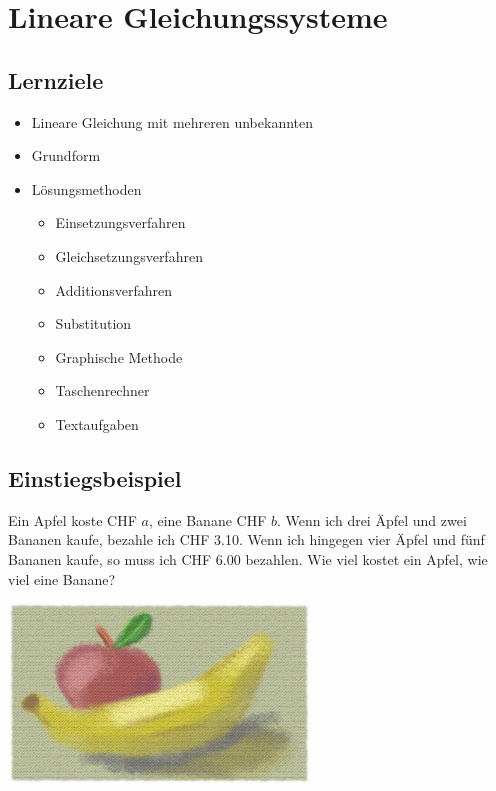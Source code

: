 \section{Lineare Gleichungssysteme}

\subsection*{Lernziele}
\begin{itemize}
	\item{Lineare Gleichung mit mehreren unbekannten}
	\item{Grundform}
	\item{Lösungsmethoden}
	\begin{itemize}
		\item{Einsetzungsverfahren}
		\item{Gleichsetzungsverfahren}
		\item{Additionsverfahren}
		\item{Substitution}
		\item{Graphische Methode}
		\item{Taschenrechner}
    \item Textaufgaben
	\end{itemize}

\end{itemize}

\newpage


\subsection{Einstiegsbeispiel}
Ein Apfel koste CHF $a$, eine Banane CHF $b$. Wenn ich drei Äpfel und zwei Bananen kaufe, bezahle ich CHF 3.10. Wenn ich hingegen vier Äpfel und fünf Bananen kaufe, so muss ich CHF 6.00 bezahlen. Wie viel kostet ein Apfel, wie viel eine Banane?

\begin{center}\includegraphics[width=8cm]{allg/gls/img/ApfelBanane.jpg}\end{center}

